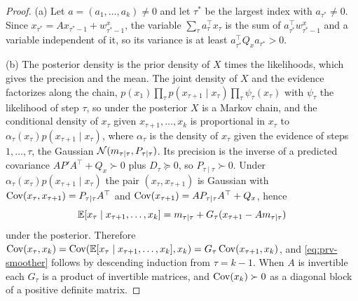 \begin{proof}
(a) Let $a=(a_1,\dots,a_k)\ne0$ and let $\tau^\ast$ be the largest index with $a_{\tau^\ast}\ne0$. Since $x_{\tau^\ast}=Ax_{\tau^\ast-1}+w^x_{\tau^\ast-1}$, the variable $\sum_\tau a_\tau^\top x_\tau$ is the sum of $a_{\tau^\ast}^\top w^x_{\tau^\ast-1}$ and a variable independent of it, so its variance is at least $a_{\tau^\ast}^\top Q_xa_{\tau^\ast}>0$.

(b) The posterior density is the prior density of $X$ times the likelihoods, which gives the precision and the mean. The joint density of $X$ and the evidence factorizes along the chain, $p(x_1)\prod_\tau p(x_{\tau+1}\mid x_\tau)\prod_\tau\psi_\tau(x_\tau)$ with $\psi_\tau$ the likelihood of step $\tau$, so under the posterior $X$ is a Markov chain, and the conditional density of $x_\tau$ given $x_{\tau+1},\dots,x_k$ is proportional in $x_\tau$ to $\alpha_\tau(x_\tau)p(x_{\tau+1}\mid x_\tau)$, where $\alpha_\tau$ is the density of $x_\tau$ given the evidence of steps $1,\dots,\tau$, the Gaussian $\mathcal{N}(m_{\tau\mid\tau},P_{\tau\mid\tau})$. Its precision is the inverse of a predicted covariance $AP'A^\top+Q_x\succ0$ plus $D_\tau\succeq0$, so $P_{\tau\mid\tau}\succ0$. Under $\alpha_\tau(x_\tau)p(x_{\tau+1}\mid x_\tau)$ the pair $(x_\tau,x_{\tau+1})$ is Gaussian with $\operatorname{Cov}(x_\tau,x_{\tau+1})=P_{\tau\mid\tau}A^\top$ and $\operatorname{Cov}(x_{\tau+1})=AP_{\tau\mid\tau}A^\top+Q_x$, hence
\[
\mathbb{E}[x_\tau\mid x_{\tau+1},\dots,x_k]=m_{\tau\mid\tau}+G_\tau(x_{\tau+1}-Am_{\tau\mid\tau})
\]
under the posterior. Therefore $\operatorname{Cov}(x_\tau,x_k)=\operatorname{Cov}(\mathbb{E}[x_\tau\mid x_{\tau+1},\dots,x_k],x_k)=G_\tau\operatorname{Cov}(x_{\tau+1},x_k)$, and \eqref{eq:prv-smoother} follows by descending induction from $\tau=k-1$. When $A$ is invertible each $G_\tau$ is a product of invertible matrices, and $\operatorname{Cov}(x_k)\succ0$ as a diagonal block of a positive definite matrix.
\end{proof}

